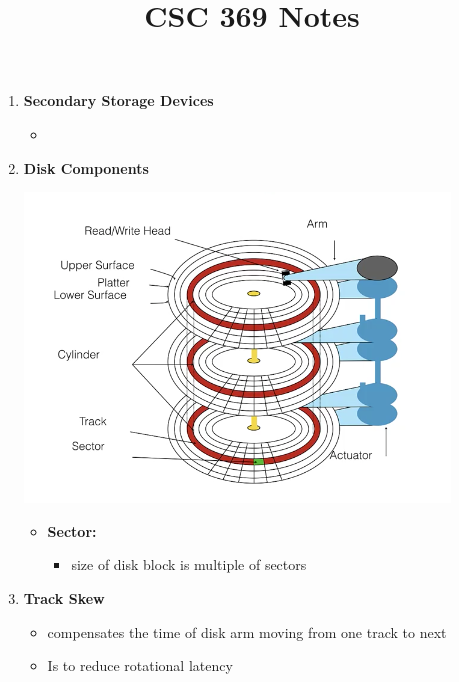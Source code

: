 \documentclass[12pt]{article}
\begin{document}
\title{CSC 369 Notes}

\begin{enumerate}[1.]
    \item \textbf{Secondary Storage Devices}

    \begin{itemize}
        \item
    \end{itemize}
    \item \textbf{Disk Components}

    \begin{center}
    \includegraphics[width=0.8\linewidth]{images/notes_1.png}
    \end{center}

    \begin{itemize}
        \item \textbf{Sector:}
        \begin{itemize}
            \item size of disk block is multiple of sectors
        \end{itemize}
    \end{itemize}
    \item \textbf{Track Skew}
    \begin{itemize}
        \item compensates the time of disk arm moving from one track to next
        \item Is to reduce rotational latency
    \end{itemize}
\end{enumerate}
\end{document}
